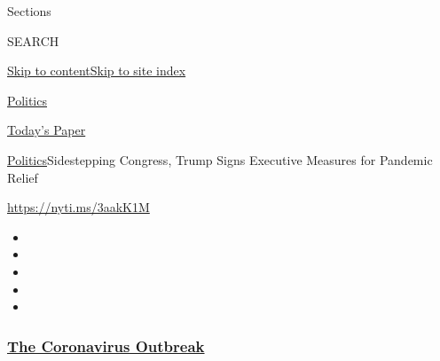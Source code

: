 Sections

SEARCH

\protect\hyperlink{site-content}{Skip to
content}\protect\hyperlink{site-index}{Skip to site index}

\href{https://www.nytimes3xbfgragh.onion/section/politics}{Politics}

\href{https://myaccount.nytimes3xbfgragh.onion/auth/login?response_type=cookie\&client_id=vi}{}

\href{https://www.nytimes3xbfgragh.onion/section/todayspaper}{Today's
Paper}

\href{/section/politics}{Politics}\textbar{}Sidestepping Congress, Trump
Signs Executive Measures for Pandemic Relief

\url{https://nyti.ms/3aakK1M}

\begin{itemize}
\item
\item
\item
\item
\item
\end{itemize}

\hypertarget{the-coronavirus-outbreak}{%
\subsubsection{\texorpdfstring{\href{https://www.nytimes3xbfgragh.onion/news-event/coronavirus?name=styln-coronavirus-national\&region=TOP_BANNER\&block=storyline_menu_recirc\&action=click\&pgtype=Article\&impression_id=412ca600-f52d-11ea-96a2-f52873655d97\&variant=undefined}{The
Coronavirus
Outbreak}}{The Coronavirus Outbreak}}\label{the-coronavirus-outbreak}}

